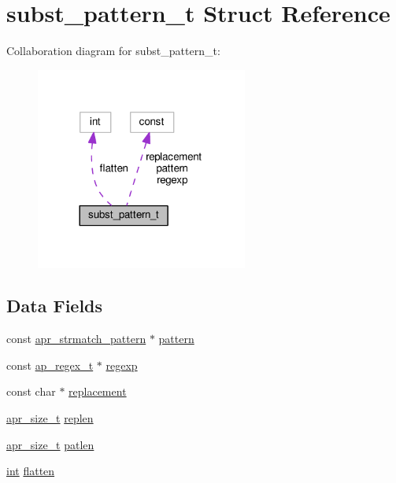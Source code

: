 \hypertarget{structsubst__pattern__t}{}\section{subst\+\_\+pattern\+\_\+t Struct Reference}
\label{structsubst__pattern__t}


Collaboration diagram for subst\+\_\+pattern\+\_\+t\+:
\nopagebreak
\begin{figure}[H]
\begin{center}
\leavevmode
\includegraphics[width=197pt]{structsubst__pattern__t__coll__graph}
\end{center}
\end{figure}
\subsection*{Data Fields}
\begin{DoxyCompactItemize}
\item 
const \hyperlink{structapr__strmatch__pattern}{apr\+\_\+strmatch\+\_\+pattern} $\ast$ \hyperlink{structsubst__pattern__t_a5c8dac2a6ff42acdfcd3f73450251d42}{pattern}
\item 
const \hyperlink{structap__regex__t}{ap\+\_\+regex\+\_\+t} $\ast$ \hyperlink{structsubst__pattern__t_a0dda144f8006dce7d47d545377491c4d}{regexp}
\item 
const char $\ast$ \hyperlink{structsubst__pattern__t_a7d93fdafe14c88621b37a2fd95963efa}{replacement}
\item 
\hyperlink{group__apr__platform_gaaa72b2253f6f3032cefea5712a27540e}{apr\+\_\+size\+\_\+t} \hyperlink{structsubst__pattern__t_aa643b69b26a4991bd33a5b428892bfdd}{replen}
\item 
\hyperlink{group__apr__platform_gaaa72b2253f6f3032cefea5712a27540e}{apr\+\_\+size\+\_\+t} \hyperlink{structsubst__pattern__t_a0b63d4aafdd1339694d61d43937cb6ea}{patlen}
\item 
\hyperlink{pcre_8txt_a42dfa4ff673c82d8efe7144098fbc198}{int} \hyperlink{structsubst__pattern__t_a2e82f89a2de0f9327f837e0386ba846c}{flatten}
\end{DoxyCompactItemize}


